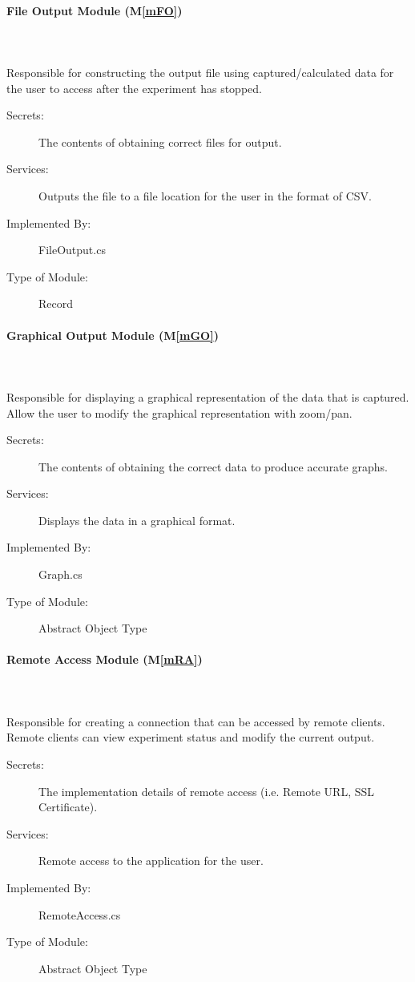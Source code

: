 \documentclass[12pt, titlepage]{article}
\newcommand{\mref}[1]{M\ref{#1}}
\begin{document}
\paragraph{File Output Module (\mref{mFO})}
\\~\\
Responsible for constructing the output file using captured/calculated data for the user to access after the experiment has stopped.
\begin{description}
\item[Secrets:]The contents of obtaining correct files for output.
\item[Services:]Outputs the file to a file location for the user in the format of CSV. 
\item[Implemented By:] FileOutput.cs
\item[Type of Module:] Record
\end{description}

\paragraph{Graphical Output Module (\mref{mGO})}
\\~\\
Responsible for displaying a graphical representation of the data that is captured. Allow the user to modify the graphical representation with zoom/pan.
\begin{description}
\item[Secrets:] The contents of obtaining the correct data to produce accurate graphs.
\item[Services:]Displays the data in a graphical format. 
\item[Implemented By:] Graph.cs
\item[Type of Module:] Abstract Object Type
\end{description}

\paragraph{Remote Access Module (\mref{mRA})} 
\\~\\
Responsible for creating a connection that can be accessed by remote clients. Remote clients can view experiment status and modify the current output.

\begin{description}
\item[Secrets:]The implementation details of remote access (i.e. Remote URL, SSL Certificate). 
\item[Services:]Remote access to the application for the user.
\item[Implemented By:] RemoteAccess.cs
\item[Type of Module:] Abstract Object Type
\end{description}
\end{document}
